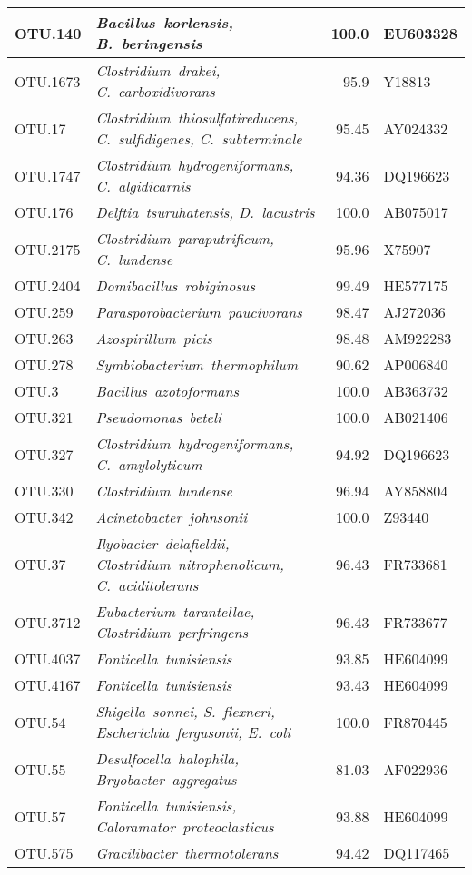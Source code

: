 \begin{table}[H]
{\begin{tabular}{l>{\itshape}p{10cm}rl}
OTU.140 & Bacillus~korlensis, B.~beringensis & 100.0 & EU603328 \\ \midrule
OTU.1673 & Clostridium~drakei, C.~carboxidivorans & 95.9 & Y18813 \\ \midrule
OTU.17 & Clostridium~thiosulfatireducens, C.~sulfidigenes, C.~subterminale & 95.45 & AY024332 \\ \midrule
OTU.1747 & Clostridium~hydrogeniformans, C.~algidicarnis & 94.36 & DQ196623 \\ \midrule
OTU.176 & Delftia~tsuruhatensis, D.~lacustris & 100.0 & AB075017 \\ \midrule
OTU.2175 & Clostridium~paraputrificum, C.~lundense & 95.96 & X75907 \\ \midrule
OTU.2404 & Domibacillus~robiginosus & 99.49 & HE577175 \\ \midrule
OTU.259 & Parasporobacterium~paucivorans & 98.47 & AJ272036 \\ \midrule
OTU.263 & Azospirillum~picis & 98.48 & AM922283 \\ \midrule
OTU.278 & Symbiobacterium~thermophilum & 90.62 & AP006840 \\ \midrule
OTU.3 & Bacillus~azotoformans & 100.0 & AB363732 \\ \midrule
OTU.321 & Pseudomonas~beteli & 100.0 & AB021406 \\ \midrule
OTU.327 & Clostridium~hydrogeniformans, C.~amylolyticum & 94.92 & DQ196623 \\ \midrule
OTU.330 & Clostridium~lundense & 96.94 & AY858804 \\ \midrule
OTU.342 & Acinetobacter~johnsonii & 100.0 & Z93440 \\ \midrule
OTU.37 & Ilyobacter~delafieldii, Clostridium~nitrophenolicum, C.~aciditolerans & 96.43 & FR733681 \\ \midrule
OTU.3712 & Eubacterium~tarantellae, Clostridium~perfringens & 96.43 & FR733677 \\ \midrule
OTU.4037 & Fonticella~tunisiensis & 93.85 & HE604099 \\ \midrule
OTU.4167 & Fonticella~tunisiensis & 93.43 & HE604099 \\ \midrule
OTU.54 & Shigella~sonnei, S.~flexneri, Escherichia~fergusonii, E.~coli & 100.0 & FR870445 \\ \midrule
OTU.55 & Desulfocella~halophila, Bryobacter~aggregatus & 81.03 & AF022936 \\ \midrule
OTU.57 & Fonticella~tunisiensis, Caloramator~proteoclasticus & 93.88 & HE604099 \\ \midrule
OTU.575 & Gracilibacter~thermotolerans & 94.42 & DQ117465 \\ \midrule

\end{tabular}}
\end{table}
